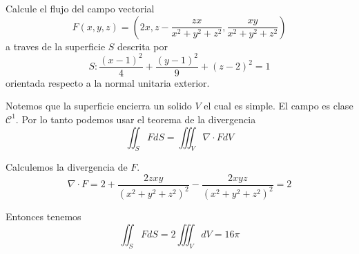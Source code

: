 \documentclass[../main.tex]{subfiles}
\begin{document}
\begin{problem}
  Calcule el flujo del campo vectorial \begin{equation*} F(x, y, z) = (2x, z - \frac{zx}{x^{2} + y^{2} + z^{2}}, \frac{xy}{x^{2} + y^{2} + z^{2}})\end{equation*} a traves de la superficie $S$ descrita por
  \begin{equation*}
    S: \frac{(x - 1)^{2}}{4} + \frac{(y - 1)^{2}}{9} + (z - 2)^{2} = 1
  \end{equation*}
  orientada respecto a la normal unitaria exterior.
\end{problem}
\begin{solution}
  Notemos que la superficie encierra un solido $V$ el cual es simple. El campo es clase $\mathcal{C}^{1}$. Por lo tanto podemos usar el teorema de la divergencia
  \begin{equation*}
    \iint_{S} F dS = \iiint_{V} \nabla \cdot F dV
  \end{equation*}

  Calculemos la divergencia de $F$.
  \begin{equation*}
    \nabla \cdot F = 2 + \frac{2zxy}{(x^{2} + y^{2} + z^{2})^{2}} - \frac{2xyz}{(x^{2} + y^{2} + z^{2})^{2}} = 2
  \end{equation*}

  Entonces tenemos
  \begin{equation*}
    \iint_{S} F dS = 2 \iiint_{V} dV = 16 \pi
  \end{equation*}
\end{solution}
\end{document}
